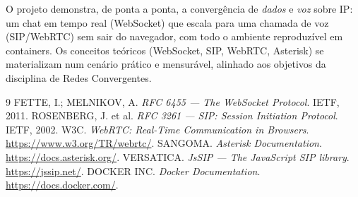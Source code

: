 \documentclass[11pt,a4paper]{article}
\begin{document}
O projeto demonstra, de ponta a ponta, a convergência de \emph{dados} e \emph{voz} sobre IP:
um chat em tempo real (WebSocket) que escala para uma chamada de voz (SIP/WebRTC) sem sair do
navegador, com todo o ambiente reproduzível em containers. Os conceitos teóricos (WebSocket,
SIP, WebRTC, Asterisk) se materializam num cenário prático e mensurável, alinhado aos
objetivos da disciplina de Redes Convergentes.

\begin{thebibliography}{9}
 FETTE, I.; MELNIKOV, A. \emph{RFC 6455 --- The WebSocket Protocol}. IETF, 2011.
 ROSENBERG, J. et al. \emph{RFC 3261 --- SIP: Session Initiation Protocol}. IETF, 2002.
 W3C. \emph{WebRTC: Real-Time Communication in Browsers}. \url{https://www.w3.org/TR/webrtc/}.
 SANGOMA. \emph{Asterisk Documentation}. \url{https://docs.asterisk.org/}.
 VERSATICA. \emph{JsSIP --- The JavaScript SIP library}. \url{https://jssip.net/}.
 DOCKER INC. \emph{Docker Documentation}. \url{https://docs.docker.com/}.
\end{thebibliography}
\end{document}
